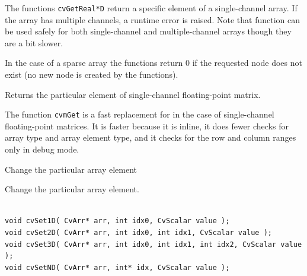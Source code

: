 \begin{description}
\end{description}


The functions \texttt{cvGetReal*D} return a specific element of a single-channel array. If the array has multiple channels, a runtime error is raised. Note that  function can be used safely for both single-channel and multiple-channel arrays though they are a bit slower.

In the case of a sparse array the functions return 0 if the requested node does not exist (no new node is created by the functions).

\label{mGet}

Returns the particular element of single-channel floating-point matrix.


\begin{description}
\end{description}

The function \texttt{cvmGet} is a fast replacement for 
in the case of single-channel floating-point matrices. It is faster because
it is inline, it does fewer checks for array type and array element type,
and it checks for the row and column ranges only in debug mode.

\ifplastex
{} 
 
 
Change the particular array element

\else
{}\label{Set*D}

Change the particular array element.

\begin{lstlisting}

void cvSet1D( CvArr* arr, int idx0, CvScalar value );
void cvSet2D( CvArr* arr, int idx0, int idx1, CvScalar value );
void cvSet3D( CvArr* arr, int idx0, int idx1, int idx2, CvScalar value );
void cvSetND( CvArr* arr, int* idx, CvScalar value );

\end{lstlisting}
\fi

